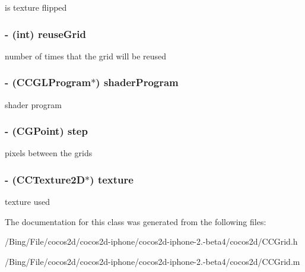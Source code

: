 is texture flipped \hypertarget{interface_c_c_grid_base_a1a4a6492ed5eeaa7bf33ade7333fc0d5}{
\subsubsection[{reuse\-Grid}]{\setlength{\rightskip}{0pt plus 5cm}-\/ (int) {\bf reuse\-Grid}}}\label{interface_c_c_grid_base_a1a4a6492ed5eeaa7bf33ade7333fc0d5}
number of times that the grid will be reused \hypertarget{interface_c_c_grid_base_a7d119a5c4877b9cf4762f61843d76da4}{
\subsubsection[{shader\-Program}]{\setlength{\rightskip}{0pt plus 5cm}-\/ ({\bf C\-C\-G\-L\-Program}$\ast$) {\bf shader\-Program}}}\label{interface_c_c_grid_base_a7d119a5c4877b9cf4762f61843d76da4}
shader program \hypertarget{interface_c_c_grid_base_a2b4025931d481909fb29648726ea4b18}{
\subsubsection[{step}]{\setlength{\rightskip}{0pt plus 5cm}-\/ (C\-G\-Point) {\bf step}}}\label{interface_c_c_grid_base_a2b4025931d481909fb29648726ea4b18}
pixels between the grids \hypertarget{interface_c_c_grid_base_ab987cc079795423117e6ced0c419a288}{
\subsubsection[{texture}]{\setlength{\rightskip}{0pt plus 5cm}-\/ ({\bf C\-C\-Texture2\-D}$\ast$) {\bf texture}}}\label{interface_c_c_grid_base_ab987cc079795423117e6ced0c419a288}
texture used 

The documentation for this class was generated from the following files\-:\begin{DoxyCompactItemize}
\item 
/\-Bing/\-File/cocos2d/cocos2d-\/iphone/cocos2d-\/iphone-\/2.-\/beta4/cocos2d/C\-C\-Grid.\-h\item 
/\-Bing/\-File/cocos2d/cocos2d-\/iphone/cocos2d-\/iphone-\/2.-\/beta4/cocos2d/C\-C\-Grid.\-m\end{DoxyCompactItemize}
